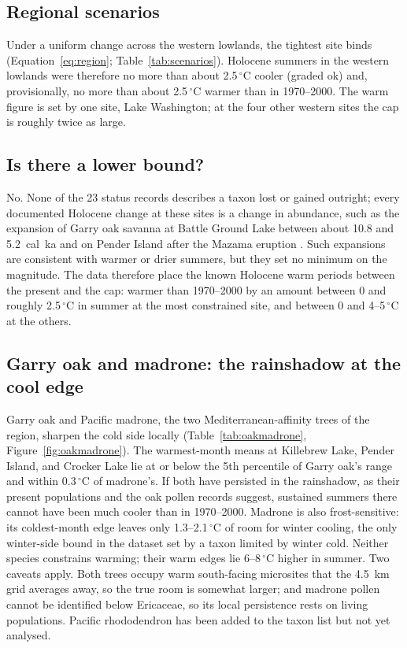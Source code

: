 \documentclass[11pt]{article}
\newcommand{\degC}{\ensuremath{^{\circ}}C}
\begin{document}
\subsection{Regional scenarios}

Under a uniform change across the western lowlands, the tightest site binds (Equation~\ref{eq:region}; Table~\ref{tab:scenarios}). Holocene summers in the western lowlands were therefore no more than about 2.5\,\degC{} cooler (graded ok) and, provisionally, no more than about 2.5\,\degC{} warmer than in 1970--2000. The warm figure is set by one site, Lake Washington; at the four other western sites the cap is roughly twice as large.



\subsection{Is there a lower bound?}

No. None of the 23 status records describes a taxon lost or gained outright; every documented Holocene change at these sites is a change in abundance, such as the expansion of Garry oak savanna at Battle Ground Lake between about 10.8 and 5.2~cal~ka \citep{walsh2008battleground} and on Pender Island after the Mazama eruption \citep{lucaslacourse2013}. Such expansions are consistent with warmer or drier summers, but they set no minimum on the magnitude. The data therefore place the known Holocene warm periods between the present and the cap: warmer than 1970--2000 by an amount between 0 and roughly 2.5\,\degC{} in summer at the most constrained site, and between 0 and 4--5\,\degC{} at the others.

\subsection{Garry oak and madrone: the rainshadow at the cool edge}

Garry oak and Pacific madrone, the two Mediterranean-affinity trees of the region, sharpen the cold side locally (Table~\ref{tab:oakmadrone}, Figure~\ref{fig:oakmadrone}). The warmest-month means at Killebrew Lake, Pender Island, and Crocker Lake lie at or below the 5th percentile of Garry oak's range and within 0.3\,\degC{} of madrone's. If both have persisted in the rainshadow, as their present populations and the oak pollen records suggest, sustained summers there cannot have been much cooler than in 1970--2000. Madrone is also frost-sensitive: its coldest-month edge leaves only 1.3--2.1\,\degC{} of room for winter cooling, the only winter-side bound in the dataset set by a taxon limited by winter cold. Neither species constrains warming; their warm edges lie 6--8\,\degC{} higher in summer. Two caveats apply. Both trees occupy warm south-facing microsites that the 4.5~km grid averages away, so the true room is somewhat larger; and madrone pollen cannot be identified below Ericaceae, so its local persistence rests on living populations. Pacific rhododendron has been added to the taxon list but not yet analysed.
\end{document}
